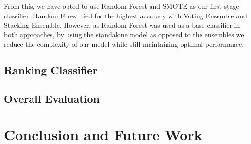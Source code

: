 \documentclass[conference]{IEEEtran}
\begin{document}
From this, we have opted to use Random Forest and SMOTE as our first stage classifier. Random Forest tied for the highest accuracy with Voting Ensemble and Stacking Ensemble. However, as Random Forest was used as a base classifier in both approaches, by using the standalone model as opposed to the ensembles we reduce the complexity of our model while still maintaining optimal performance.

\subsection{Ranking Classifier}
\subsection{Overall Evaluation}

\section{Conclusion and Future Work}




\end{document}
